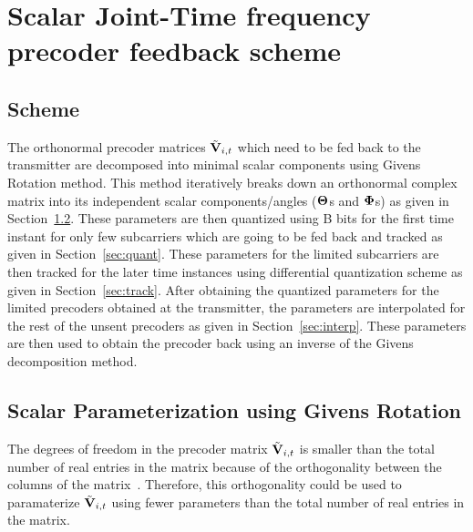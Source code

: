 \documentclass[11pt,a4paper]{report}
\def\bV{{\bf V}}
\begin{document}
\chapter{Scalar Joint-Time frequency precoder feedback scheme}
\label{chap:scheme}

\section{Scheme}
The orthonormal precoder matrices $\tilde{\bV}_{i,t}$ which need to be fed back
to the transmitter are decomposed into minimal scalar components using
Givens Rotation method. This method iteratively breaks down an orthonormal
complex matrix into its independent scalar components/angles
($\bf{\Theta}$s and $\bf{\Phi}$s) as given in Section~\ref{sec:param}. 
These parameters are then quantized using B bits for the first time instant 
for only few subcarriers which are going to be fed back and tracked as given 
in Section~\ref{sec:quant}. These parameters for the limited subcarriers are 
then tracked for the later time instances using differential quantization scheme
as given in Section~\ref{sec:track}. 
After obtaining the quantized parameters for the limited precoders obtained
at the transmitter, the parameters are interpolated for the rest of the unsent
precoders as given in Section~\ref{sec:interp}. These parameters are then used 
to obtain the precoder back using an inverse of the Givens decomposition method. 

\section{Scalar Parameterization using Givens Rotation}
\label{sec:param}
The degrees of freedom in the precoder matrix $\tilde{\bV}_{i,t}$ is
smaller than the total number of real entries in the matrix because of 
the orthogonality between the columns of the matrix~\cite{4114278}.
Therefore, this orthogonality could be used to paramaterize $\tilde{\bV}_{i,t}$ 
using fewer parameters than the total number of real entries in the matrix.
\end{document}
